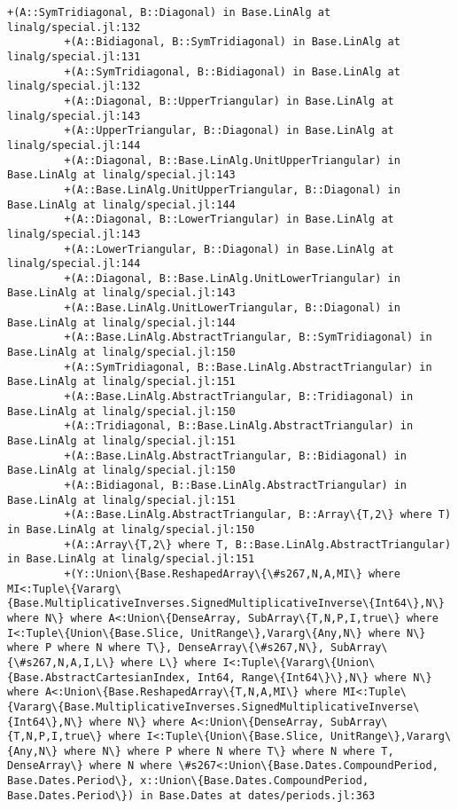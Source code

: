 \documentclass[11pt]{article}
\begin{document}
\begin{Verbatim}[commandchars=\\\{\}]
         +(A::SymTridiagonal, B::Diagonal) in Base.LinAlg at linalg/special.jl:132
         +(A::Bidiagonal, B::SymTridiagonal) in Base.LinAlg at linalg/special.jl:131
         +(A::SymTridiagonal, B::Bidiagonal) in Base.LinAlg at linalg/special.jl:132
         +(A::Diagonal, B::UpperTriangular) in Base.LinAlg at linalg/special.jl:143
         +(A::UpperTriangular, B::Diagonal) in Base.LinAlg at linalg/special.jl:144
         +(A::Diagonal, B::Base.LinAlg.UnitUpperTriangular) in Base.LinAlg at linalg/special.jl:143
         +(A::Base.LinAlg.UnitUpperTriangular, B::Diagonal) in Base.LinAlg at linalg/special.jl:144
         +(A::Diagonal, B::LowerTriangular) in Base.LinAlg at linalg/special.jl:143
         +(A::LowerTriangular, B::Diagonal) in Base.LinAlg at linalg/special.jl:144
         +(A::Diagonal, B::Base.LinAlg.UnitLowerTriangular) in Base.LinAlg at linalg/special.jl:143
         +(A::Base.LinAlg.UnitLowerTriangular, B::Diagonal) in Base.LinAlg at linalg/special.jl:144
         +(A::Base.LinAlg.AbstractTriangular, B::SymTridiagonal) in Base.LinAlg at linalg/special.jl:150
         +(A::SymTridiagonal, B::Base.LinAlg.AbstractTriangular) in Base.LinAlg at linalg/special.jl:151
         +(A::Base.LinAlg.AbstractTriangular, B::Tridiagonal) in Base.LinAlg at linalg/special.jl:150
         +(A::Tridiagonal, B::Base.LinAlg.AbstractTriangular) in Base.LinAlg at linalg/special.jl:151
         +(A::Base.LinAlg.AbstractTriangular, B::Bidiagonal) in Base.LinAlg at linalg/special.jl:150
         +(A::Bidiagonal, B::Base.LinAlg.AbstractTriangular) in Base.LinAlg at linalg/special.jl:151
         +(A::Base.LinAlg.AbstractTriangular, B::Array\{T,2\} where T) in Base.LinAlg at linalg/special.jl:150
         +(A::Array\{T,2\} where T, B::Base.LinAlg.AbstractTriangular) in Base.LinAlg at linalg/special.jl:151
         +(Y::Union\{Base.ReshapedArray\{\#s267,N,A,MI\} where MI<:Tuple\{Vararg\{Base.MultiplicativeInverses.SignedMultiplicativeInverse\{Int64\},N\} where N\} where A<:Union\{DenseArray, SubArray\{T,N,P,I,true\} where I<:Tuple\{Union\{Base.Slice, UnitRange\},Vararg\{Any,N\} where N\} where P where N where T\}, DenseArray\{\#s267,N\}, SubArray\{\#s267,N,A,I,L\} where L\} where I<:Tuple\{Vararg\{Union\{Base.AbstractCartesianIndex, Int64, Range\{Int64\}\},N\} where N\} where A<:Union\{Base.ReshapedArray\{T,N,A,MI\} where MI<:Tuple\{Vararg\{Base.MultiplicativeInverses.SignedMultiplicativeInverse\{Int64\},N\} where N\} where A<:Union\{DenseArray, SubArray\{T,N,P,I,true\} where I<:Tuple\{Union\{Base.Slice, UnitRange\},Vararg\{Any,N\} where N\} where P where N where T\} where N where T, DenseArray\} where N where \#s267<:Union\{Base.Dates.CompoundPeriod, Base.Dates.Period\}, x::Union\{Base.Dates.CompoundPeriod, Base.Dates.Period\}) in Base.Dates at dates/periods.jl:363

\end{Verbatim}
\end{document}
